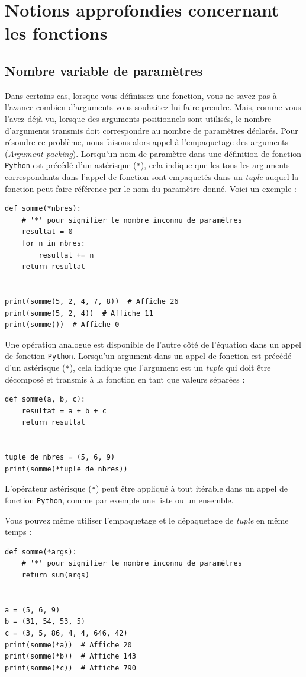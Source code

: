 \documentclass[a4paper,12pt]{book}
\begin{document}
\chapter{Notions approfondies concernant les fonctions}
\section{Nombre variable de paramètres}
Dans certains cas, lorsque vous définissez une fonction, vous ne savez pas à l'avance combien d'arguments vous souhaitez lui faire prendre. Mais, comme vous l'avez déjà vu, lorsque des arguments positionnels sont utilisés, le nombre d'arguments transmis doit correspondre au nombre de paramètres déclarés. Pour résoudre ce problème, nous faisons alors appel à l'empaquetage des arguments (\og \textit{Argument packing}\fg{}). Lorsqu'un nom de paramètre dans une définition de fonction \texttt{Python} est précédé d'un astérisque (\texttt{*}), cela indique que les tous les arguments correspondants dans l'appel de fonction sont empaquetés dans un \textit{tuple} auquel la fonction peut faire référence par le nom du paramètre donné. Voici un exemple :
\begin{lstlisting}[caption=Nombre de paramètres non connu]
def somme(*nbres):  
    # '*' pour signifier le nombre inconnu de paramètres
    resultat = 0
    for n in nbres:
        resultat += n
    return resultat
  
  
print(somme(5, 2, 4, 7, 8))  # Affiche 26
print(somme(5, 2, 4))  # Affiche 11
print(somme())  # Affiche 0
\end{lstlisting}
\medskip

Une opération analogue est disponible de l'autre côté de l'équation dans un appel de fonction \texttt{Python}. Lorsqu'un argument dans un appel de fonction est précédé d'un astérisque (\texttt{*}), cela indique que l'argument est un \textit{tuple} qui doit être décomposé et transmis à la fonction en tant que valeurs séparées :
\begin{lstlisting}[caption=Décomposition de \textit{tuple}]
def somme(a, b, c):
    resultat = a + b + c
    return resultat


tuple_de_nbres = (5, 6, 9)
print(somme(*tuple_de_nbres))
\end{lstlisting}
\medskip

L'opérateur astérisque (\texttt{*}) peut être appliqué à tout itérable dans un appel de fonction \texttt{Python}, comme par exemple une liste ou un ensemble.
\medskip

Vous pouvez même utiliser l'empaquetage et le dépaquetage de \textit{tuple} en même temps :
\begin{lstlisting}[caption=Empaquetage et dépaquetage]
def somme(*args):
    # '*' pour signifier le nombre inconnu de paramètres
    return sum(args)


a = (5, 6, 9)
b = (31, 54, 53, 5)
c = (3, 5, 86, 4, 4, 646, 42)
print(somme(*a))  # Affiche 20
print(somme(*b))  # Affiche 143
print(somme(*c))  # Affiche 790
\end{lstlisting}
\medskip
\end{document}
